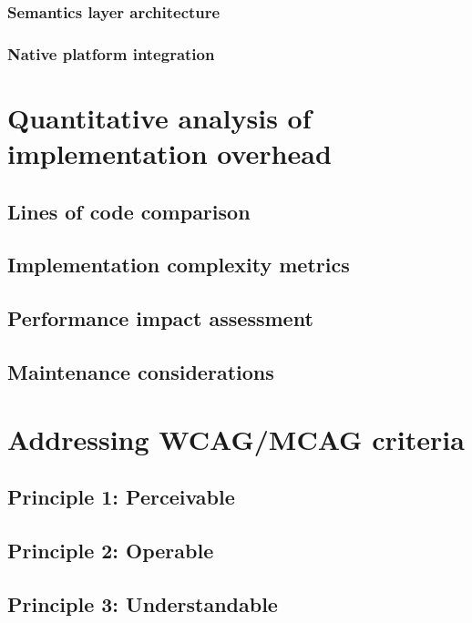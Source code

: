 \subsubsection{Semantics layer architecture}

\subsubsection{Native platform integration}

\section{Quantitative analysis of implementation overhead}

\subsection{Lines of code comparison}

\subsection{Implementation complexity metrics}

\subsection{Performance impact assessment}

\subsection{Maintenance considerations}

\section{Addressing WCAG/MCAG criteria}

\subsection{Principle 1: Perceivable}

\subsection{Principle 2: Operable}

\subsection{Principle 3: Understandable}


